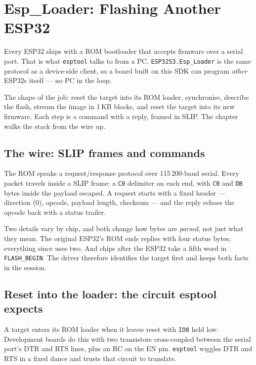 \chapter[Esp\_Loader: Flashing Another ESP32]%
        {Esp\_Loader: Flashing Another ESP32}
\label{ch:esp_loader}

Every ESP32 ships with a ROM bootloader that accepts firmware over a serial
port. That is what \texttt{esptool} talks to from a PC. \texttt{ESP32S3.Esp\_Loader}
is the same protocol as a device-side client, so a board built on this SDK can
program \emph{other} ESP32s itself --- no PC in the
loop.

The shape of the job: reset the target into its ROM loader, synchronise,
describe the flash, stream the image in 1\,KB blocks, and reset the target into
its new firmware. Each step is a command with a reply, framed in SLIP. The
chapter walks the stack from the wire up.

\section{The wire: SLIP frames and commands}

The ROM speaks a request/response protocol over 115\,200-baud serial. Every
packet travels inside a SLIP frame: a \texttt{C0} delimiter on each end, with
\texttt{C0} and \texttt{DB} bytes inside the payload escaped. A request starts
with a fixed header --- direction (0), opcode, payload length, checksum --- and
the reply echoes the opcode back with a status trailer.

Two details vary by chip, and both change how bytes are \emph{parsed}, not just
what they mean. The original ESP32's ROM ends replies with four status bytes;
everything since uses two. And chips after the ESP32 take a fifth word in
\texttt{FLASH\_BEGIN}. The driver therefore identifies the target first and
keeps both facts in the session.

\section{Reset into the loader: the circuit esptool expects}

A target enters its ROM loader when it leaves reset with \texttt{IO0} held low.
Development boards do this with two transistors cross-coupled between the serial
port's DTR and RTS lines, plus an RC on the EN pin. \texttt{esptool} wiggles
DTR and RTS in a fixed dance and trusts that circuit to translate.

